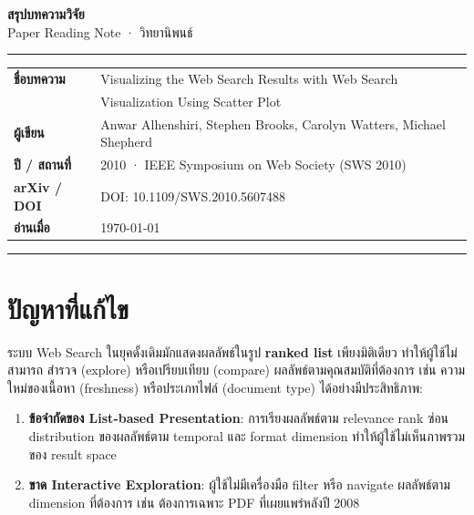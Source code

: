 \documentclass[10pt,a4paper]{article}
\begin{document}
\begin{center}
  {\Large \textbf{สรุปบทความวิจัย}}\\[6pt]
  {\color{muted}\small Paper Reading Note · วิทยานิพนธ์}
\end{center}

\noindent\rule{\textwidth}{1.5pt}

\vspace{12pt}
\noindent
\begin{tabular}{@{}ll@{}}
  \textbf{ชื่อบทความ}  & Visualizing the Web Search Results with Web Search \\
                        & Visualization Using Scatter Plot \\[4pt]
  \textbf{ผู้เขียน}    & Anwar Alhenshiri, Stephen Brooks, Carolyn Watters, Michael Shepherd \\[4pt]
  \textbf{ปี / สถานที่} & 2010 · IEEE Symposium on Web Society (SWS 2010) \\[4pt]
  \textbf{arXiv / DOI}  & DOI: 10.1109/SWS.2010.5607488 \\[4pt]
  \textbf{อ่านเมื่อ}   & \today \\
\end{tabular}

\vspace{12pt}
\noindent\rule{\textwidth}{0.4pt}

\section*{ปัญหาที่แก้ไข}

ระบบ Web Search ในยุคดั้งเดิมมักแสดงผลลัพธ์ในรูป \textbf{ranked list} เพียงมิติเดียว ทำให้ผู้ใช้ไม่สามารถ
สำรวจ (explore) หรือเปรียบเทียบ (compare) ผลลัพธ์ตามคุณสมบัติที่ต้องการ เช่น ความใหม่ของเนื้อหา
(freshness) หรือประเภทไฟล์ (document type) ได้อย่างมีประสิทธิภาพ:
\begin{enumerate}
  \item \textbf{ข้อจำกัดของ List-based Presentation}: การเรียงผลลัพธ์ตาม relevance rank ซ่อน
    distribution ของผลลัพธ์ตาม temporal และ format dimension ทำให้ผู้ใช้ไม่เห็นภาพรวมของ
    result space
  \item \textbf{ขาด Interactive Exploration}: ผู้ใช้ไม่มีเครื่องมือ filter หรือ navigate ผลลัพธ์ตาม
    dimension ที่ต้องการ เช่น ต้องการเฉพาะ PDF ที่เผยแพร่หลังปี 2008
\end{enumerate}
\end{document}
